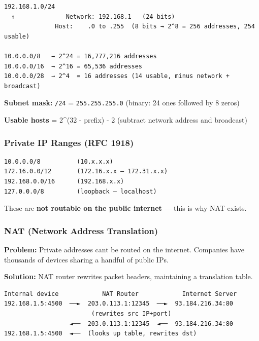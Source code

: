 \documentclass[11pt]{article}
\begin{document}
\setcodelang{}

\begin{verbatim}
192.168.1.0/24
  ↑              Network: 192.168.1   (24 bits)
              Host:    .0 to .255  (8 bits → 2^8 = 256 addresses, 254 usable)

10.0.0.0/8   → 2^24 = 16,777,216 addresses
10.0.0.0/16  → 2^16 = 65,536 addresses
10.0.0.0/28  → 2^4  = 16 addresses (14 usable, minus network + broadcast)
\end{verbatim}

\textbf{Subnet mask:} \texttt{/24} = \texttt{255.255.255.0} (binary: 24 ones followed by 8 zeros)

\textbf{Usable hosts} = 2\^{}(32 - prefix) - 2 (subtract network address and broadcast)

\subsubsection{Private IP Ranges (RFC 1918)}\label{private-ip-ranges-rfc-1918}

\setcodelang{}

\begin{verbatim}
10.0.0.0/8          (10.x.x.x)
172.16.0.0/12       (172.16.x.x – 172.31.x.x)
192.168.0.0/16      (192.168.x.x)
127.0.0.0/8         (loopback — localhost)
\end{verbatim}

These are \textbf{not routable on the public internet} --- this is why NAT exists.

\subsubsection{NAT (Network Address Translation)}\label{nat-network-address-translation}

\textbf{Problem:} Private addresses can\textquotesingle t be routed on the internet. Companies have thousands of devices sharing a handful of public IPs.

\textbf{Solution:} NAT router rewrites packet headers, maintaining a translation table.

\setcodelang{}

\begin{verbatim}
Internal device            NAT Router            Internet Server
192.168.1.5:4500  ──►  203.0.113.1:12345  ──►  93.184.216.34:80
                        (rewrites src IP+port)
                  ◄──  203.0.113.1:12345  ◄──  93.184.216.34:80
192.168.1.5:4500  ◄──  (looks up table, rewrites dst)
\end{verbatim}
\end{document}
